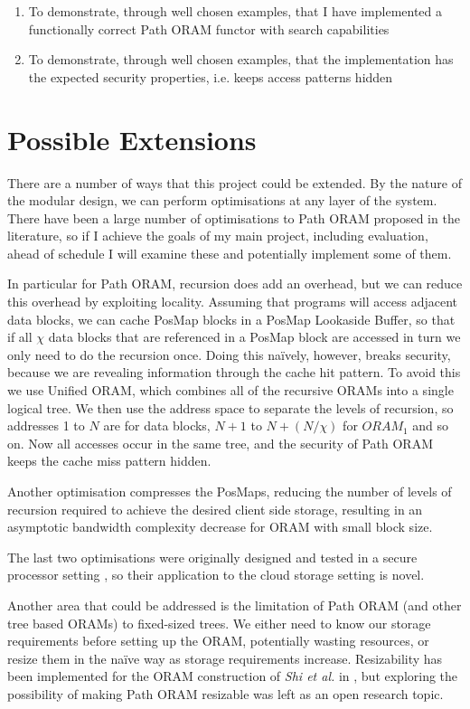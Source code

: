 \documentclass[12pt,a4paper,twoside]{article}
\begin{document}
\begin{enumerate}
	\item To demonstrate, through well chosen examples, that I have implemented a functionally correct Path ORAM functor with search capabilities
	\item To demonstrate, through well chosen examples, that the implementation has the expected security properties, i.e. keeps access patterns hidden
\end{enumerate}


\section*{Possible Extensions}

There are a number of ways that this project could be extended. By the nature of the modular design, we can perform optimisations at any layer of the system. There have been a large number of optimisations to Path ORAM proposed in the literature, so if I achieve the goals of my main project, including evaluation, ahead of schedule I will examine these and potentially implement some of them.

In particular for Path ORAM, recursion does add an overhead, but we can reduce this overhead by exploiting locality. Assuming that programs will access adjacent data blocks, we can cache PosMap blocks in a PosMap Lookaside Buffer, so that if all $\chi$ data blocks that are referenced in a PosMap block are accessed in turn we only need to do the recursion once. Doing this na\"ively, however, breaks security, because we are revealing information through the cache hit pattern. To avoid this we use Unified ORAM, which combines all of the recursive ORAMs into a single logical tree. We then use the address space to separate the levels of recursion, so addresses 1 to $N$ are for data blocks, $N + 1$ to $N + (N / \chi)$ for $ORAM_1$ and so on. Now all accesses occur in the same tree, and the security of Path ORAM keeps the cache miss pattern hidden.

Another optimisation compresses the PosMaps, reducing the number of levels of recursion required to achieve the desired client side storage, resulting in an asymptotic bandwidth complexity decrease for ORAM with small block size.

The last two optimisations were originally designed and tested in a secure processor setting \cite{ren2014unified}, so their application to the cloud storage setting is novel.

Another area that could be addressed is the limitation of Path ORAM (and other tree based ORAMs) to fixed-sized trees. We either need to know our storage requirements before setting up the ORAM, potentially wasting resources, or resize them in the na\"ive way as storage requirements increase. Resizability has been implemented for the ORAM construction of \emph{Shi et al.} \cite{shi2011oblivious} in \cite{moataz2015resizable}, but exploring the possibility of making Path ORAM resizable was left as an open research topic.
\end{document}
